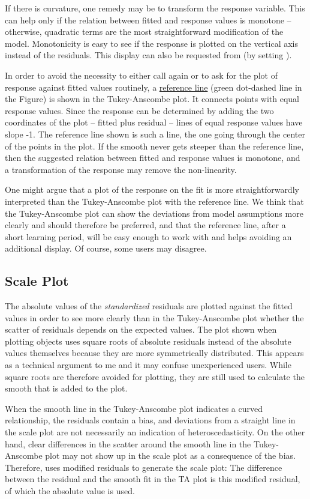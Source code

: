 \documentclass[11pt]{article}\usepackage[]{graphicx}\usepackage[]{color}
\begin{document}
If there is curvature, one remedy may be to transform the response
variable. This can help only if the relation between fitted and
response values is monotone -- otherwise, quadratic terms are the
most straightforward modification of the model.
Monotonicity is easy to see if the response is plotted on the vertical
axis instead of the residuals.
This display can also be requested from 
(by setting ).

In order to avoid the necessity to either call  again or to 
ask for the plot of response against fitted values routinely,
a \ul{reference line} (green dot-dashed line in the Figure)
is shown in the Tukey-Anscombe plot.
It connects points with equal response values. Since the response can be
determined by adding the two coordinates of the plot -- 
fitted plus residual -- lines of equal response values have slope -1.
The reference line shown is such a line, the one going through the center
of the points in the plot.
If the smooth never gets steeper than the reference line, then the
suggested relation between fitted and response values is monotone, and a
transformation of the response may remove the non-linearity.

One might argue that a plot of the response on the fit is more
straightforwardly interpreted than the Tukey-Anscombe plot with the
reference line. We think that the Tukey-Anscombe plot can show the
deviations from model assumptions more clearly and should therefore be
preferred, and that the reference line, after a short learning period, will
be easy enough to work with and helps avoiding an additional display. 
Of course, some users may disagree.

\subsection{Scale Plot}
The absolute values of the \emph{standardized} residuals are plotted
against the fitted values 
in order to see more clearly than in the Tukey-Anscombe plot whether the 
scatter of residuals depends on the expected values.
The plot shown when plotting  objects uses square roots of absolute
residuals instead of the absolute values themselves because they are more
symmetrically distributed. This appears as a technical argument to me and
it may confuse unexperienced users. While square roots are therefore
avoided for plotting, they are still used to calculate the smooth that is
added to the plot.

When the smooth line in the Tukey-Anscombe plot indicates a curved
relationship, the residuals contain a bias, and deviations from a straight
line in the scale plot are not necessarily an indication of
heteroscedasticity. On the other hand, clear differences in the scatter
around the smooth line in the Tukey-Anscombe plot may not show up in 
the scale plot as a consequence of the bias.
Therefore,  uses modified residuals to generate the scale
plot: The difference between the residual and the smooth fit in the
TA plot is this modified residual, of which the absolute value is used.
\end{document}
